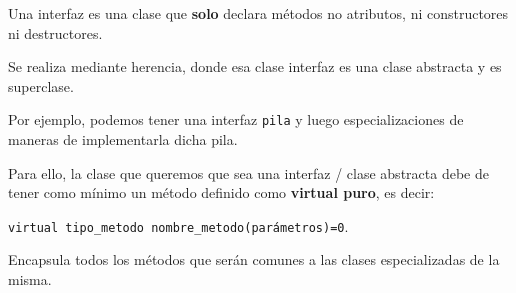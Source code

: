Una interfaz es una clase que \textbf{solo} declara métodos no atributos, ni constructores ni destructores.

Se realiza mediante herencia, donde esa clase interfaz es una clase abstracta y es superclase.

Por ejemplo, podemos tener una interfaz \texttt{pila} y luego especializaciones de maneras de implementarla dicha pila.

Para ello, la clase que queremos que sea una interfaz / clase abstracta debe de tener como mínimo un método definido como \textbf{virtual puro}, es decir:
\begin{center}
	\texttt{virtual tipo\_metodo nombre\_metodo(parámetros)=0}. 

\end{center} 
Encapsula todos los métodos que serán comunes a las clases especializadas de la misma.